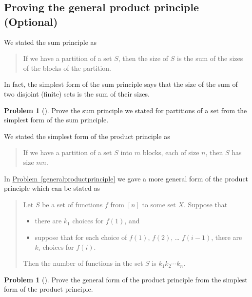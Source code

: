 \documentclass[10pt,]{book}
\theoremstyle{plain}
\theoremstyle{definition}
\newtheorem{activity}[project]{Problem}
\theoremstyle{definition}
\numberwithin{equation}{chapter}
\begin{document}
\subsection[{Proving the general product principle (Optional)}]{Proving the general product principle (Optional)}\label{subsection-14}
We stated the sum principle as%
\begin{quote}\hypertarget{blockquote-9}{}
If we have a partition of a set \(S\), then the size of \(S\) is the sum of the sizes of the blocks of the partition.%
\end{quote}
In fact, the simplest form of the sum principle says that the size of the sum of two disjoint (finite) sets is the sum of their sizes.%
\begin{activity}[]\marginsymbol[-1em]{} \label{activity-79}
Prove the sum principle we stated for partitions of a set from the simplest form of the sum principle.%
\end{activity}
We stated the simplest form of the product principle as%
\begin{quote}\hypertarget{blockquote-10}{}
If we have a partition of a set \(S\) into \(m\) blocks, each of size \(n\), then \(S\) has size \(mn\).%
\end{quote}
In \hyperref[generalproductprinciple]{Problem~\ref{generalproductprinciple}} we gave a more general form of the product principle which can be stated as %
\begin{quote}\hypertarget{blockquote-11}{}
Let \(S\) be a set of functions \(f\) from \([n]\) to some set \(X\).  Suppose that \leavevmode%
\begin{itemize}[label=\textbullet]
\item{}there are \(k_1\) choices for \(f(1)\), and%
\item{}suppose that for each choice of \(f(1)\), \(f(2)\), \dots{} \(f(i-1)\), there are \(k_i\) choices for \(f(i)\).%
\end{itemize}
 Then the number of functions in the set \(S\) is \(k_1k_2\cdots k_n\).%
\end{quote}
\begin{activity}[] \label{generalproductprincipleproof}
Prove the general form of the product principle from the simplest form of the product principle.%
\end{activity}
\typeout{************************************************}
\typeout{************************************************}
\end{document}
